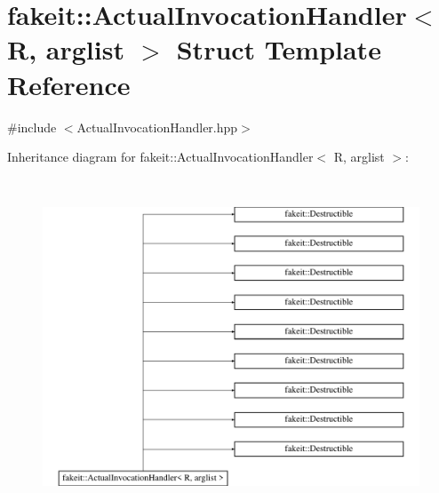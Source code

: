 \hypertarget{structfakeit_1_1ActualInvocationHandler}{}\section{fakeit\+::Actual\+Invocation\+Handler$<$ R, arglist $>$ Struct Template Reference}
\label{structfakeit_1_1ActualInvocationHandler}


{\ttfamily \#include $<$Actual\+Invocation\+Handler.\+hpp$>$}

Inheritance diagram for fakeit\+::Actual\+Invocation\+Handler$<$ R, arglist $>$\+:\begin{figure}[H]
\begin{center}
\leavevmode
\includegraphics[height=10.000000cm]{structfakeit_1_1ActualInvocationHandler}
\end{center}
\end{figure}
